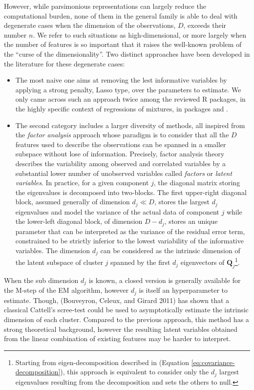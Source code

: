 However, while parsimonious representations can largely reduce the computational burden, none of them in the general family is able to deal with degenerate cases when the dimension of the observations, \(D\), exceeds their number \(n\). We refer to such situations as high-dimensional, or more largely when the number of features is so important that it raises the well-known problem of the ``curse of the dimensionality''. Two distinct approaches have been developed in the literature for these degenerate cases:

\begin{itemize}
\item
  The most naive one aims at removing the lest informative variables by applying a strong penalty, Lasso type, over the parameters to estimate. We only came across such an approach twice among the reviewed R packages, in the highly specific context of regressions of mixtures, in packages  and .
\item
  The second category includes a larger diversity of methods, all inspired from the \emph{factor analysis} approach whose paradigm is to consider that all the \(D\) features used to describe the observations can be spanned in a smaller subspace without lose of information. Precisely, factor analysis theory describes the variability among observed and correlated variables by a substantial lower number of unobserved variables called \emph{factors} or \emph{latent variables}. In practice, for a given component \(j\), the diagonal matrix storing the eigenvalues is decomposed into two-blocks. The first upper-right diagonal block, assumed generally of dimension \(d_j \ll D\), stores the largest \(d_j\) eigenvalues and model the variance of the actual data of component \(j\) while the lower-left diagonal block, of dimension \(D-d_j\), stores an unique parameter that can be interpreted as the variance of the residual error term, constrained to be strictly inferior to the lowest variability of the informative variables. The dimension \(d_j\) can be considered as the intrinsic dimension of the latent subspace of cluster \(j\) spanned by the first \(d_j\) eigenvectors of \(\boldsymbol{Q}_j\)\footnote{Starting from eigen-decomposition described in (Equation \eqref{eq:covariance-decomposition}), this approach is equivalent to consider only the \(d_j\) largest eigenvalues resulting from the decomposition and sets the others to null.}.
\end{itemize}

When the sub dimension \(d_j\) is known, a closed version is generally available for the M-step of the EM algorithm, however \(d_j\) is itself an hyperparameter to estimate. Though, (Bouveyron, Celeux, and Girard 2011) has shown that a classical Cattell's scree-test could be used to asymptotically estimate the intrinsic dimension of each cluster. Compared to the previous approach, this method has a strong theoretical background, however the resulting latent variables obtained from the linear combination of existing features may be harder to interpret.

